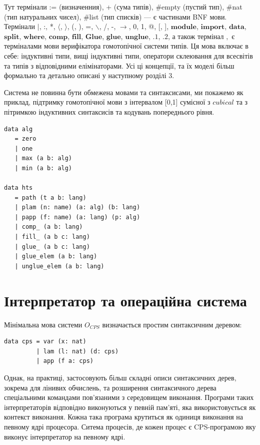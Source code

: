 Тут термінали := (визначенния), + (сума типів), \#empty (пустий тип), \#nat (тип натуральних чисел),
\#list (тип списків) --- є частинами BNF мови. Термінали
$\rvert$, :, *, $\langle$, $\rangle$, (, ), =, $\backslash$, /, -, $\rightarrow$, 0, 1, @, [, ],
$\mathbf{module}$, $\mathbf{import}$,
$\mathbf{data}$, $\mathbf{split}$, $\mathbf{where}$, $\mathbf{comp}$, $\mathbf{fill}$,
$\mathbf{Glue}$, $\mathbf{glue}$, $\mathbf{unglue}$,
$\mathbf{.1}$, $\mathbf{.2}$,
а також термінал $,$ є терміналами мови верифікатора гомотопічної системи типів.
Ця мова включає в себе: індуктивні типи, вищі індуктивні типи, оператори склеювання
для всесвітів та типів з відповідними елімінаторами. Усі ці концепції, та їх
моделі більш формально та детально описані у наступному розділі 3.

Система не повинна бути обмежена мовами та синтаксисами, ми покажемо як приклад,
підтримку гомотопічної мови з інтервалом [0,1] сумісної з $cubical$ та з пітримкою індуктивних
синтаксисів та кодувань попереднього рівня.

\begin{lstlisting}[mathescape=true]
data alg
   = zero
   | one
   | max (a b: alg)
   | min (a b: alg)

data hts
   = path (t a b: lang)
   | plam (n: name) (a: alg) (b: lang)
   | papp (f: name) (a: lang) (p: alg)
   | comp_ (a b: lang)
   | fill_ (a b c: lang)
   | glue_ (a b c: lang)
   | glue_elem (a b: lang)
   | unglue_elem (a b: lang)
\end{lstlisting}

\section{Інтерпретатор та операційна система}

Мінімальна мова системи $O_{CPS}$ визначається простим
синтаксичним деревом:

\begin{lstlisting}
data cps = var (x: nat)
         | lam (l: nat) (d: cps)
         | app (f a: cps)
\end{lstlisting}

Однак, на практиці, застосовують більш складні описи синтаксичних дерев,
зокрема для лінивих обчислень, та розширення синтаксичного дерева спеціальними
командами пов'язаними з середовищем виконання. Програми таких
інтерпретаторів відповідно виконуються у певній пам'яті, яка
використовується як контекст виконання. Кожна така програма крутиться
як одиниця виконання на певному ядрі процесора. Ситема процесів, де
кожен процес є CPS-програмою яку виконує інтерпретатор на певному ядрі.

